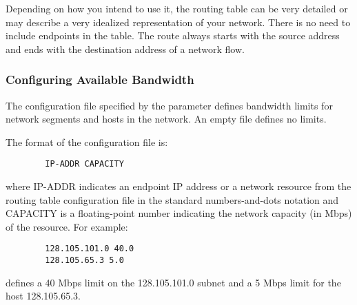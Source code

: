 Depending on how you intend to use it, the routing table can be very
detailed or may describe a very idealized representation of your
network.
There is no need to include endpoints in the table.
The route always starts with the source address and ends with the
destination address of a network flow.

\subsubsection{\label{sec:Bandwidth-Alloc-Capinfo}
Configuring Available Bandwidth}

The configuration file specified by the 
 parameter defines bandwidth limits
for network segments and hosts in the network.
An empty file defines no limits.

The format of the configuration file is:
\begin{verbatim}
        IP-ADDR CAPACITY
\end{verbatim}
where IP-ADDR indicates an endpoint IP address or a network resource
from the routing table configuration file in the standard
numbers-and-dots notation and CAPACITY is a floating-point number
indicating the network capacity (in Mbps) of the resource.
For example:
\begin{verbatim}
        128.105.101.0 40.0
        128.105.65.3 5.0
\end{verbatim}
defines a 40 Mbps limit on the 128.105.101.0 subnet and a 5 Mbps limit
for the host 128.105.65.3.
